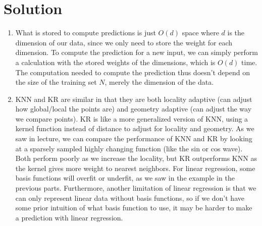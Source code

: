 \documentclass[submit]{harvardml}
\newenvironment{solution}
  {\color{magenta}\section*{Solution}}
{}
\begin{document}
\begin{solution}
\begin{enumerate}
    \item What is stored to compute predictions is just $O(d)$ space where $d$ is the dimension of our data, since we only need to store the weight for each dimension. To compute the prediction for a new input, we can simply perform a calculation with the stored weights of the dimensions, which is $O(d)$ time. The computation needed to compute the prediction thus doesn't depend on the size of the training set $N$, merely the dimension of the data. 

    \item KNN and KR are similar in that they are both locality adaptive (can adjust how global/local the points are) and geometry adaptive (can adjust the way we compare points). KR is like a more generalized version of KNN, using a kernel function instead of distance to adjust for locality and geometry. As we saw in lecture, we can compare the performance of KNN and KR by looking at a sparsely sampled highly changing function (like the sin or cos wave). Both perform poorly as we increase the locality, but KR outperforms KNN as the kernel gives more weight to nearest neighbors. For linear regression, some basis functions will overfit or underfit, as we saw in the example in the previous parts. Furthermore, another limitation of linear regression is that we can only represent linear data without basis functions, so if we don't have some prior intuition of what basis function to use, it may be harder to make a prediction with linear regression. 
    
\end{enumerate}
\end{solution}
\end{document}
